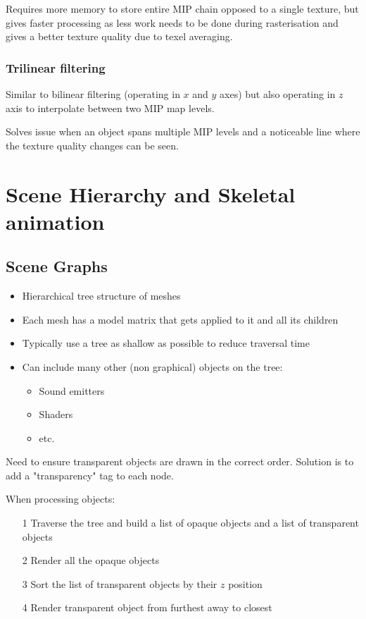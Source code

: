 \documentclass[a4paper]{article}
\begin{document}
Requires more memory to store entire MIP chain opposed to a single texture, but
gives faster processing as less work needs to be done during rasterisation and
gives a better texture quality due to texel averaging.

\subsubsection{Trilinear filtering}

Similar to bilinear filtering (operating in $x$ and $y$ axes) but also operating
in $z$ axis to interpolate between two MIP map levels.

Solves issue when an object spans multiple MIP levels and a noticeable line where
the texture quality changes can be seen.

\section{Scene Hierarchy and Skeletal animation}

\subsection{Scene Graphs}

\begin{itemize}
  \item Hierarchical tree structure of meshes
  \item Each mesh has a model matrix that gets applied to it and all its
    children
  \item Typically use a tree as shallow as possible to reduce traversal time
  \item Can include many other (non graphical) objects on the tree:
    \begin{itemize}
      \item Sound emitters
      \item Shaders
      \item etc.
    \end{itemize}
\end{itemize}

Need to ensure transparent objects are drawn in the correct order. Solution is
to add a "transparency" tag to each node.

When processing objects:
\begin{enumerate}
  \item[1] Traverse the tree and build a list of opaque objects and a list of
    transparent objects
  \item[2] Render all the opaque objects
  \item[3] Sort the list of transparent objects by their $z$ position
  \item[4] Render transparent object from furthest away to closest
\end{enumerate}
\end{document}

